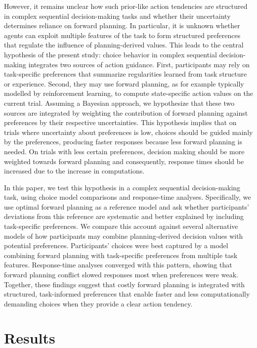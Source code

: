 \documentclass[
  letterpaper,
  DIV=11,
  numbers=noendperiod]{scrartcl}
\begin{document}
However, it remains unclear how such prior-like action tendencies are
structured in complex sequential decision-making tasks and whether their
uncertainty determines reliance on forward planning. In particular, it
is unknown whether agents can exploit multiple features of the task to
form structured preferences that regulate the influence of
planning-derived values. This leads to the central hypothesis of the
present study: choice behavior in complex sequential decision-making
integrates two sources of action guidance. First, participants may rely
on task-specific preferences that summarize regularities learned from
task structure or experience. Second, they may use forward planning, as
for example typically modelled by reinforcement learning, to compute
state-specific action values on the current trial. Assuming a Bayesian
approach, we hypothesize that these two sources are integrated by
weighting the contribution of forward planning against preferences by
their respective uncertainties. This hypothesis implies that on trials
where uncertainty about preferences is low, choices should be guided
mainly by the preferences, producing faster responses because less
forward planning is needed. On trials with less certain preferences,
decision making should be more weighted towards forward planning and
consequently, response times should be increased due to the increase in
computations.

In this paper, we test this hypothesis in a complex sequential
decision-making task, using choice model comparisons and response-time
analyses. Specifically, we use optimal forward planning as a reference
model and ask whether participants' deviations from this reference are
systematic and better explained by including task-specific preferences.
We compare this account against several alternative models of how
participants may combine planning-derived decision values with potential
preferences. Participants' choices were best captured by a model
combining forward planning with task-specific preferences from multiple
task features. Response-time analyses converged with this pattern,
showing that forward planning conflict slowed responses most when
preferences were weak. Together, these findings suggest that costly
forward planning is integrated with structured, task-informed
preferences that enable faster and less computationally demanding
choices when they provide a clear action tendency.

\section{Results}\label{results}
\end{document}
